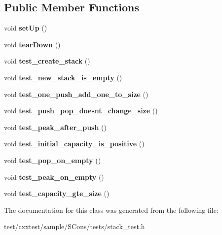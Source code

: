 \subsection*{Public Member Functions}
\begin{DoxyCompactItemize}
\item 
\hypertarget{classstack__test_ac9c42542a44a8cca09ba982e3c6966cd}{void {\bfseries set\-Up} ()}\label{classstack__test_ac9c42542a44a8cca09ba982e3c6966cd}

\item 
\hypertarget{classstack__test_ae5cb966735db8cff2ce873d8779e74df}{void {\bfseries tear\-Down} ()}\label{classstack__test_ae5cb966735db8cff2ce873d8779e74df}

\item 
\hypertarget{classstack__test_aa8befdeb76d9890b7158e6044f52bd0a}{void {\bfseries test\-\_\-create\-\_\-stack} ()}\label{classstack__test_aa8befdeb76d9890b7158e6044f52bd0a}

\item 
\hypertarget{classstack__test_ae4398bbf735c9020b5d2eed1a01276c6}{void {\bfseries test\-\_\-new\-\_\-stack\-\_\-is\-\_\-empty} ()}\label{classstack__test_ae4398bbf735c9020b5d2eed1a01276c6}

\item 
\hypertarget{classstack__test_ad918558eee24348b6fb5f129ef8aa5a7}{void {\bfseries test\-\_\-one\-\_\-push\-\_\-add\-\_\-one\-\_\-to\-\_\-size} ()}\label{classstack__test_ad918558eee24348b6fb5f129ef8aa5a7}

\item 
\hypertarget{classstack__test_af7bfaea0ab0a1c6ca0681db96dd099fa}{void {\bfseries test\-\_\-push\-\_\-pop\-\_\-doesnt\-\_\-change\-\_\-size} ()}\label{classstack__test_af7bfaea0ab0a1c6ca0681db96dd099fa}

\item 
\hypertarget{classstack__test_ae58c5c19e9565bc97b382caf7ece8605}{void {\bfseries test\-\_\-peak\-\_\-after\-\_\-push} ()}\label{classstack__test_ae58c5c19e9565bc97b382caf7ece8605}

\item 
\hypertarget{classstack__test_a66bfabfabbf088da21518846ab1a82f7}{void {\bfseries test\-\_\-initial\-\_\-capacity\-\_\-is\-\_\-positive} ()}\label{classstack__test_a66bfabfabbf088da21518846ab1a82f7}

\item 
\hypertarget{classstack__test_afa0eb85d3be138f045f820c2a523efbf}{void {\bfseries test\-\_\-pop\-\_\-on\-\_\-empty} ()}\label{classstack__test_afa0eb85d3be138f045f820c2a523efbf}

\item 
\hypertarget{classstack__test_ad54c8c45a7076a003b0b10a64641fde9}{void {\bfseries test\-\_\-peak\-\_\-on\-\_\-empty} ()}\label{classstack__test_ad54c8c45a7076a003b0b10a64641fde9}

\item 
\hypertarget{classstack__test_a2c4755162f884c21e001589a5278728c}{void {\bfseries test\-\_\-capacity\-\_\-gte\-\_\-size} ()}\label{classstack__test_a2c4755162f884c21e001589a5278728c}

\end{DoxyCompactItemize}


The documentation for this class was generated from the following file\-:\begin{DoxyCompactItemize}
\item 
test/cxxtest/sample/\-S\-Cons/tests/stack\-\_\-test.\-h\end{DoxyCompactItemize}
